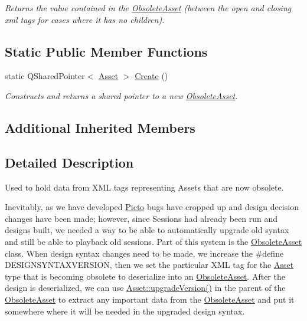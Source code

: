 \begin{DoxyCompactItemize}
\begin{DoxyCompactList}\small\item\em Returns the value contained in the \hyperlink{class_picto_1_1_obsolete_asset}{Obsolete\-Asset} (between the open and closing xml tags for cases where it has no children). \end{DoxyCompactList}\end{DoxyCompactItemize}
\subsection*{Static Public Member Functions}
\begin{DoxyCompactItemize}
\item 
\hypertarget{class_picto_1_1_obsolete_asset_a94651c2986ab08f892f66237a0b34305}{static Q\-Shared\-Pointer$<$ \hyperlink{class_picto_1_1_asset}{Asset} $>$ \hyperlink{class_picto_1_1_obsolete_asset_a94651c2986ab08f892f66237a0b34305}{Create} ()}\label{class_picto_1_1_obsolete_asset_a94651c2986ab08f892f66237a0b34305}

\begin{DoxyCompactList}\small\item\em Constructs and returns a shared pointer to a new \hyperlink{class_picto_1_1_obsolete_asset}{Obsolete\-Asset}. \end{DoxyCompactList}\end{DoxyCompactItemize}
\subsection*{Additional Inherited Members}


\subsection{Detailed Description}
Used to hold data from X\-M\-L tags representing Assets that are now obsolete. 

Inevitably, as we have developed \hyperlink{namespace_picto}{Picto} bugs have cropped up and design decision changes have been made; however, since Sessions had already been run and designs built, we needed a way to be able to automatically upgrade old syntax and still be able to playback old sessions. Part of this system is the \hyperlink{class_picto_1_1_obsolete_asset}{Obsolete\-Asset} class. When design syntax changes need to be made, we increase the \#define D\-E\-S\-I\-G\-N\-S\-Y\-N\-T\-A\-X\-V\-E\-R\-S\-I\-O\-N, then we set the particular X\-M\-L tag for the \hyperlink{class_picto_1_1_asset}{Asset} type that is becoming obsolete to deserialize into an \hyperlink{class_picto_1_1_obsolete_asset}{Obsolete\-Asset}. After the design is deserialized, we can use \hyperlink{class_picto_1_1_asset_aacaaedf9d76c3af2c7168d5c14fed914}{Asset\-::upgrade\-Version()} in the parent of the \hyperlink{class_picto_1_1_obsolete_asset}{Obsolete\-Asset} to extract any important data from the \hyperlink{class_picto_1_1_obsolete_asset}{Obsolete\-Asset} and put it somewhere where it will be needed in the upgraded design syntax.

